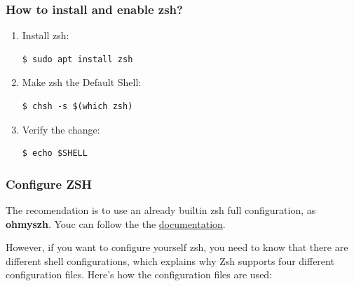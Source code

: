 \documentclass{article}
\newenvironment{codetemplate}[1][]{%
  \mybasecolorbox[#1]
  \itshape
}{%
  \endmybasecolorbox
}
\begin{document}
\subsubsection{How to install and enable zsh?}

\begin{enumerate}
    \item Install zsh:
\begin{codetemplate}{}
\begin{verbatim}
$ sudo apt install zsh
\end{verbatim}
\end{codetemplate}

    \item Make zsh the Default Shell:
\begin{codetemplate}{}
\begin{verbatim}
$ chsh -s $(which zsh)
\end{verbatim}
\end{codetemplate}

    \item Verify the change:
\begin{codetemplate}{}
\begin{verbatim}
$ echo $SHELL
\end{verbatim}
\end{codetemplate}
\end{enumerate}

\subsubsection{Configure ZSH}
The recomendation is to use an already builtin zsh full configuration, as \textbf{ohmyszh}. Youc can follow the the \href{https://github.com/titocampis/ansible-playbooks-linux-workstation/blob/main/README_ohmyzsh.md}{documentation}.

However, if you want to configure yourself zsh, you need to know that there are different shell configurations, which explains why Zsh supports four different configuration files. Here's how the configuration files are used:
\end{document}
